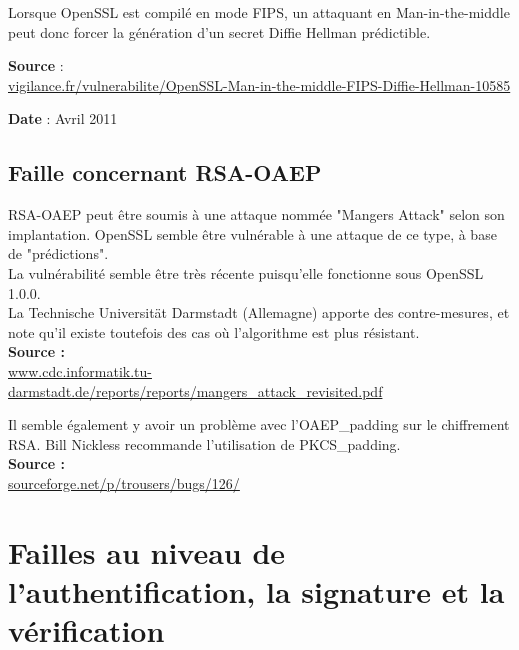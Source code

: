 \documentclass{article}
\begin{document}
	Lorsque OpenSSL est compilé en mode FIPS, un attaquant en Man-in-the-middle 
	peut donc forcer la génération d'un secret Diffie Hellman prédictible.

	\textbf{Source} : \\
	\href{http://vigilance.fr/vulnerabilite/OpenSSL-Man-in-the-middle-FIPS-Diffie-Hellman-10585}
	{vigilance.fr/vulnerabilite/OpenSSL-Man-in-the-middle-FIPS-Diffie-Hellman-10585}

	\textbf{Date} : Avril 2011

	\newpage
	
	
	\subsection{Faille concernant RSA-OAEP}
	
	RSA-OAEP peut être soumis à une attaque nommée "Mangers Attack" selon son
	implantation. OpenSSL semble être vulnérable à une attaque de ce type, à
	base de "prédictions".\\
	La vulnérabilité semble être très récente puisqu'elle fonctionne sous
	OpenSSL 1.0.0.\\
	
	La Technische Universität Darmstadt (Allemagne) apporte des contre-mesures,
	et note qu'il existe toutefois des cas où l'algorithme est plus résistant.\\
	
	\textbf{Source :} \\
	\href{http://www.cdc.informatik.tu-darmstadt.de/reports/reports/mangers\_attack\_revisited.pdf}
	{www.cdc.informatik.tu-darmstadt.de/reports/reports/mangers\_attack\_revisited.pdf}

	Il semble également y avoir un problème avec l'OAEP\_padding sur le 
	chiffrement RSA. Bill Nickless recommande l'utilisation de PKCS\_padding.\\
	
	
	\textbf{Source :} \\
	\href{http://sourceforge.net/p/trousers/bugs/126/}
	{sourceforge.net/p/trousers/bugs/126/}
	
	
	
	
	
	
	
	
	
\section{Failles au niveau de l'authentification, la signature et la vérification}
\end{document}
